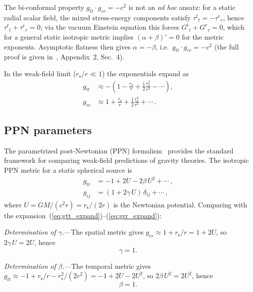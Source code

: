 \documentclass[aps,prd,onecolumn,superscriptaddress,nofootinbib,showpacs,12pt]{revtex4-2}
\newcommand{\rs}{r_{\mathrm{s}}}
\begin{document}
The bi-conformal property $g_{tt}\cdot g_{rr} = -c^{2}$ is
not an \textit{ad hoc} ansatz: for a static radial scalar
field, the mixed stress-energy components satisfy
$\tau^{t}{}_{t} = -\tau^{r}{}_{r}$, hence
$\tau^{t}{}_{t} + \tau^{r}{}_{r} = 0$; via the vacuum
Einstein equation this forces
$G^{t}{}_{t} + G^{r}{}_{r} = 0$, which for a general
static isotropic metric implies $(\alpha+\beta)' = 0$
for the metric exponents.  Asymptotic flatness then
gives $\alpha = -\beta$, i.e.\
$g_{tt}\cdot g_{rr} = -c^{2}$
(the full proof is given in~\cite{Lotishvili2026},
  Appendix~2, Sec.~4).

In the weak-field limit ($\rs/r \ll 1$) the exponentials
expand as
\begin{align}
  g_{tt} &\approx -\left(1 - \frac{\rs}{r}
           + \frac{1}{2}\frac{\rs^{2}}{r^{2}} - \cdots\right),
           \label{eq:gtt_expand}\\[4pt]
  g_{rr} &\approx 1 + \frac{\rs}{r}
           + \frac{1}{2}\frac{\rs^{2}}{r^{2}} + \cdots\,.
           \label{eq:grr_expand}
\end{align}

\subsection{PPN parameters}\label{sec:ppn}

The parametrized post-Newtonian (PPN)
formalism~\cite{Will2014,Will2018} provides the standard
framework for comparing weak-field predictions of gravity
theories.  The isotropic PPN metric for a static spherical
source is
\begin{align}
  g_{tt} &= -1 + 2U - 2\beta\,U^{2} + \cdots\,,\\
  g_{ij} &= (1 + 2\gamma\,U)\,\delta_{ij} + \cdots\,,
\end{align}
where $U = GM/(c^{2}r)= \rs/(2r)$ is the Newtonian potential.
Comparing with the expansion~(\ref{eq:gtt_expand})--(\ref{eq:grr_expand}):

\medskip\noindent
\textit{Determination of $\gamma$.}---The spatial
metric gives $g_{rr} \approx 1 + \rs/r = 1 + 2U$, so
$2\gamma\,U = 2U$, hence
\begin{equation}\label{eq:gamma}
  \boxed{\gamma = 1.}
\end{equation}

\noindent
\textit{Determination of $\beta$.}---The temporal
metric gives $g_{tt} \approx -1 + \rs/r - \rs^{2}/(2r^{2})
= -1 + 2U - 2U^{2}$, so $2\beta\,U^{2} = 2U^{2}$, hence
\begin{equation}\label{eq:beta}
  \boxed{\beta = 1.}
\end{equation}
\end{document}
